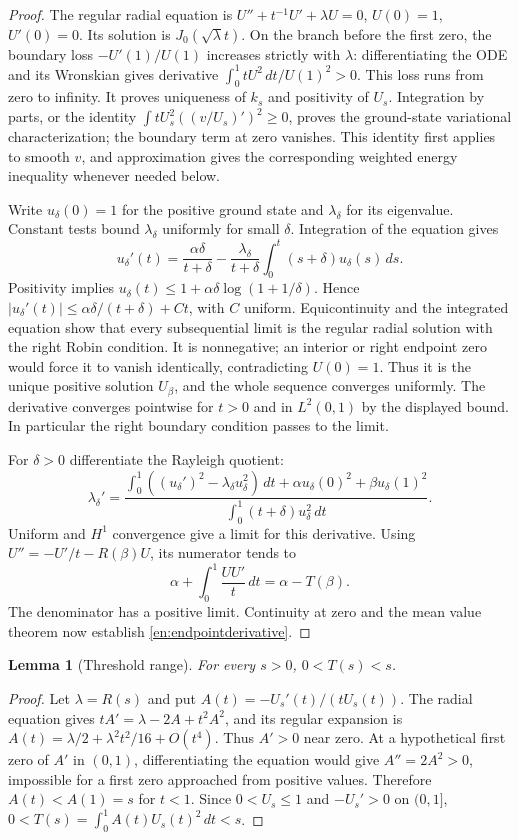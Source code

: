 \documentclass[12pt]{amsart}
\newtheorem{lem}[thm]{Lemma}
\theoremstyle{definition}
\theoremstyle{remark}
\numberwithin{equation}{section}
\begin{document}
\begin{proof}
The regular radial equation is $U''+t^{-1}U'+\lambda U=0$, $U(0)=1$, $U'(0)=0$. Its solution is $J_0(\sqrt\lambda t)$. On the branch before the first zero, the boundary loss $-U'(1)/U(1)$ increases strictly with $\lambda$: differentiating the ODE and its Wronskian gives derivative $\int_0^1tU^2\,dt/U(1)^2>0$. This loss runs from zero to infinity. It proves uniqueness of $k_s$ and positivity of $U_s$. Integration by parts, or the identity $\int tU_s^2((v/U_s)')^2\ge0$, proves the ground-state variational characterization; the boundary term at zero vanishes. This identity first applies to smooth $v$, and approximation gives the corresponding weighted energy inequality whenever needed below.

Write $u_\delta(0)=1$ for the positive ground state and $\lambda_\delta$ for its eigenvalue. Constant tests bound $\lambda_\delta$ uniformly for small $\delta$. Integration of the equation gives
\[
 u_\delta'(t)=\frac{\alpha\delta}{t+\delta}
 -\frac{\lambda_\delta}{t+\delta}\int_0^t(s+\delta)u_\delta(s)\,ds.
\]
Positivity implies $u_\delta(t)\le1+\alpha\delta\log(1+1/\delta)$. Hence
$|u_\delta'(t)|\le\alpha\delta/(t+\delta)+Ct$, with $C$ uniform. Equicontinuity and the integrated equation show that every subsequential limit is the regular radial solution with the right Robin condition. It is nonnegative; an interior or right endpoint zero would force it to vanish identically, contradicting $U(0)=1$. Thus it is the unique positive solution $U_\beta$, and the whole sequence converges uniformly. The derivative converges pointwise for $t>0$ and in $L^2(0,1)$ by the displayed bound. In particular the right boundary condition passes to the limit.

For $\delta>0$ differentiate the Rayleigh quotient:
\[
 \lambda_\delta'=
 \frac{\int_0^1((u_\delta')^2-\lambda_\delta u_\delta^2)\,dt
 +\alpha u_\delta(0)^2+\beta u_\delta(1)^2}
 {\int_0^1(t+\delta)u_\delta^2\,dt}.
\]
Uniform and $H^1$ convergence give a limit for this derivative. Using
$U''=-U'/t-R(\beta)U$, its numerator tends to
\[
 \alpha+\int_0^1\frac{UU'}t\,dt=\alpha-T(\beta).
\]
The denominator has a positive limit. Continuity at zero and the mean value theorem now establish \eqref{en:endpointderivative}.
\end{proof}

\begin{lem}[Threshold range]\label{en:thresholdrange}
For every $s>0$, $0<T(s)<s$.
\end{lem}
\begin{proof}
Let $\lambda=R(s)$ and put $A(t)=-U_s'(t)/(tU_s(t))$. The radial equation gives
$tA'=\lambda-2A+t^2A^2$, and its regular expansion is
$A(t)=\lambda/2+\lambda^2t^2/16+O(t^4)$.
Thus $A'>0$ near zero. At a hypothetical first zero of $A'$ in $(0,1)$, differentiating the equation would give $A''=2A^2>0$, impossible for a first zero approached from positive values. Therefore $A(t)<A(1)=s$ for $t<1$. Since $0<U_s\le1$ and $-U_s'>0$ on $(0,1]$,
$0<T(s)=\int_0^1 A(t)U_s(t)^2\,dt<s$.
\end{proof}
\end{document}
